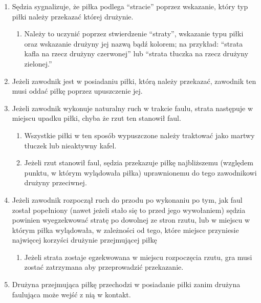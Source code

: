 \documentclass[12pt]{article}
\begin{document}
\begin{enumerate}
	\item
	      Sędzia sygnalizuje, że piłka podlega ``stracie'' poprzez wskazanie,
	      który typ piłki należy przekazać której drużynie.

	      \begin{enumerate}
		      \item
		            Należy to uczynić poprzez stwierdzenie ``straty'', wskazanie typu
		            piłki oraz wskazanie drużyny jej nazwą bądź kolorem; na przykład:
		            ``strata kafla na rzecz drużyny czerwonej'' lub ``strata tłuczka na
		            rzecz drużyny zielonej.''
	      \end{enumerate}
	\item
	      Jeżeli zawodnik jest w posiadaniu piłki, którą należy przekazać,
	      zawodnik ten musi oddać piłkę poprzez upuszczenie jej.
	\item
	      Jeżeli zawodnik wykonuje naturalny ruch w trakcie faulu, strata
	      następuje w miejscu upadku piłki, chyba że rzut ten stanowił faul.

	      \begin{enumerate}
		      \item
		            Wszystkie piłki w ten sposób wypuszczone należy traktować jako
		            martwy tłuczek lub nieaktywny kafel.
		      \item
		            Jeżeli rzut stanowił faul, sędzia przekazuje piłkę najbliższemu
		            (względem punktu, w którym wylądowała piłka) uprawnionemu do tego
		            zawodnikowi drużyny przeciwnej.
	      \end{enumerate}
	\item
	      Jeżeli zawodnik rozpoczął ruch do przodu po wykonaniu po tym, jak faul
	      został popełniony (nawet jeżeli stało się to przed jego wywołaniem)
	      sędzia powinien wyegzekwować stratę po dowolnej ze stron rzutu, lub w
	      miejscu w którym piłka wylądowała, w zależności od tego, które miejsce
	      przyniesie najwięcej korzyści drużynie przejmującej piłkę

	      \begin{enumerate}
		      \item
		            Jeżeli strata zostaje egzekwowana w miejscu rozpoczęcia rzutu, gra
		            musi zostać zatrzymana aby przeprowadzić przekazanie.
	      \end{enumerate}
	\item
	      Drużyna przejmująca piłkę przechodzi w posiadanie piłki zanim drużyna
	      faulująca może wejść z nią w kontakt.


\end{enumerate}
\end{document}
